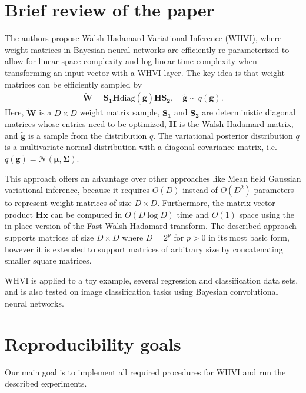 \documentclass[11pt, twocolumn]{article}
\begin{document}
    \section{Brief review of the paper}\label{sec:brief-review-of-the-paper}
    The authors propose Walsh-Hadamard Variational Inference (WHVI), where weight matrices in Bayesian neural networks are efficiently re-parameterized to allow for linear space complexity and log-linear time complexity when transforming an input vector with a WHVI layer.
    The key idea is that weight matrices can be efficiently sampled by
    \begin{align}
        \widetilde{\mathbf{W}} = \mathbf{S_1} \mathbf{H} \mathrm{diag}(\widetilde{\mathbf{g}}) \mathbf{H} \mathbf{S_2},\quad\widetilde{\mathbf{g}} \sim q(\mathbf{g}).
        \label{eqn:weight-sampling}
    \end{align}
    Here, $\widetilde{\mathbf{W}}$ is a $D \times D$ weight matrix sample, $\mathbf{S_1}$ and $\mathbf{S_2}$ are deterministic diagonal matrices whose entries need to be optimized, $\mathbf{H}$ is the Walsh-Hadamard matrix, and $\widetilde{\mathbf{g}}$ is a sample from the distribution $q$.
    The variational posterior distribution $q$ is a multivariate normal distribution with a diagonal covariance matrix, i.e.\ $q(\mathbf{g}) = \mathcal{N}(\mathbf{\mu}, \mathbf{\Sigma})$.

    This approach offers an advantage over other approaches like Mean field Gaussian variational inference, because it requires $O(D)$ instead of $O(D^2)$ parameters to represent weight matrices of size $D \times D$.
    Furthermore, the matrix-vector product $\mathbf{Hx}$ can be computed in $O(D \log D)$ time and $O(1)$ space using the in-place version of the Fast Walsh-Hadamard transform.
    The described approach supports matrices of size $D \times D$ where $D = 2^p$ for $p > 0$ in its most basic form, however it is extended to support matrices of arbitrary size by concatenating smaller square matrices.

    WHVI is applied to a toy example, several regression and classification data sets, and is also tested on image classification tasks using Bayesian convolutional neural networks.

    \section{Reproducibility goals}\label{sec:reproducibility-goals}
    Our main goal is to implement all required procedures for WHVI and run the described experiments.
\end{document}
